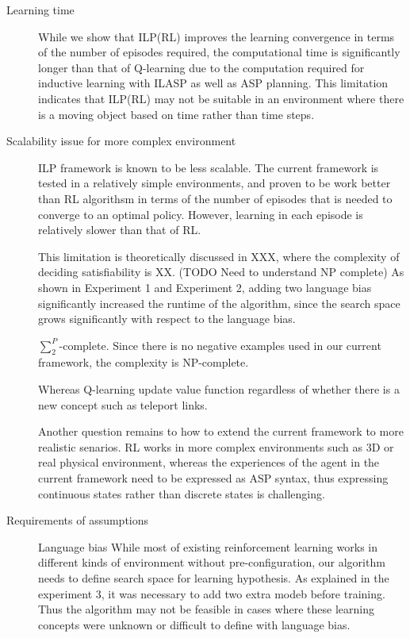 \begin{description}
\item[Learning time]
While we show that ILP(RL) improves the learning convergence in terms of the number of episodes required, the computational time is significantly longer than that of Q-learning due to the computation required for inductive learning with ILASP as well as ASP planning.
This limitation indicates that ILP(RL) may not be suitable in an environment where there is a moving object based on time rather than time steps.

\item[Scalability issue for more complex environment]
ILP framework is known to be less scalable. The current framework is tested in a relatively simple environments, 
and proven to be work better than RL algorithsm in terms of the number of episodes that is needed to converge to an optimal policy.
However, learning in each episode is relatively slower than that of RL. 

This limitation is theoretically discussed in XXX, where the complexity of deciding satisfiability is XX. (TODO Need to understand NP complete)
As shown in Experiment 1 and Experiment 2, adding two language bias significantly increased the runtime of the algorithm, since the search space grows significantly with respect to the language bias.

$\sum_{2}^{P}$-complete. Since there is no negative examples used in our current framework, the complexity is NP-complete.

Whereas Q-learning update value function regardless of whether there is a new concept such as teleport links.

Another question remains to how to extend the current framework to more realistic senarios. RL works in more complex environments such as 3D or real physical environment, 
whereas the experiences of the agent in the current framework need to be expressed as ASP syntax, thus expressing continuous states rather than discrete states is challenging.

\item[Requirements of assumptions]

Language bias
While most of existing reinforcement learning works in different kinds of environment without pre-configuration, our algorithm
needs to define search space for learning hypothesis. As explained in the experiment 3, it was necessary to add two extra modeb before training.
Thus the algorithm may not be feasible in cases where these learning concepts were unknown or difficult to define with language bias. 


\end{description}
